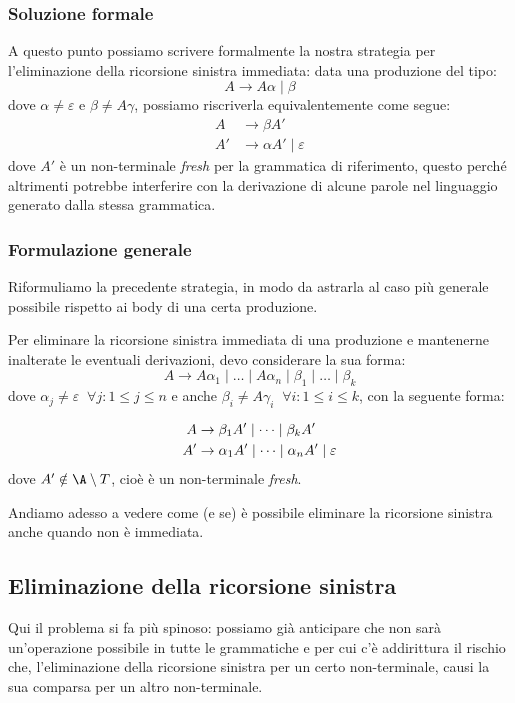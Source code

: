 \documentclass[class=book, crop=false, oneside, 12pt]{standalone}
\begin{document}
\subsubsection{Soluzione formale}
A questo punto possiamo scrivere formalmente la nostra strategia per l'eliminazione della ricorsione sinistra immediata: data una produzione del tipo:
\begin{equation*}
    A \to A \alpha \mid \beta
\end{equation*}
dove \(\alpha \ne \varepsilon\) e \(\beta \ne A \gamma\), possiamo riscriverla equivalentemente come segue:
\begin{align*}
    A &\to \beta A' \\
    A' &\to \alpha A' \mid \varepsilon
\end{align*}
dove \(A'\) è un non-terminale \emph{fresh} per la grammatica di riferimento, questo perché altrimenti potrebbe interferire con la derivazione di alcune parole nel linguaggio generato dalla stessa grammatica.

\subsubsection{Formulazione generale}
\label{subsec:left-recursive-to-ll1}
Riformuliamo la precedente strategia, in modo da astrarla al caso più generale possibile rispetto ai body di una certa produzione.

Per eliminare la ricorsione sinistra immediata di una produzione e mantenerne inalterate le eventuali derivazioni, devo considerare la sua forma:
\begin{equation}
    A \to A \alpha_1 \mid \dots \mid A \alpha_n \mid \beta_1 \mid \dots \mid \beta_k
\end{equation} 
dove \(\alpha_j \ne \varepsilon \;\; \forall j: 1 \le j \le n\) e anche \(\beta_i \ne A \gamma_i \;\; \forall i: 1 \le i \le k\), con la seguente forma:

\begin{align}
    A &\to \beta_1 A' \mid \dots \mid \beta_k A' \\
    A' &\to \alpha_1 A' \mid \dots \mid \alpha_n A' \mid \varepsilon \notag
\end{align}
dove \(A' \notin \A \setminus T\), cioè è un non-terminale \emph{fresh}.

Andiamo adesso a vedere come (e se) è possibile eliminare la ricorsione sinistra anche quando non è immediata.

\subsection{Eliminazione della ricorsione sinistra}
Qui il problema si fa più spinoso: possiamo già anticipare che non sarà un'operazione possibile in tutte le grammatiche e per cui c'è addirittura il rischio che, l'eliminazione della ricorsione sinistra per un certo non-terminale, causi la sua comparsa per un altro non-terminale.
\end{document}
